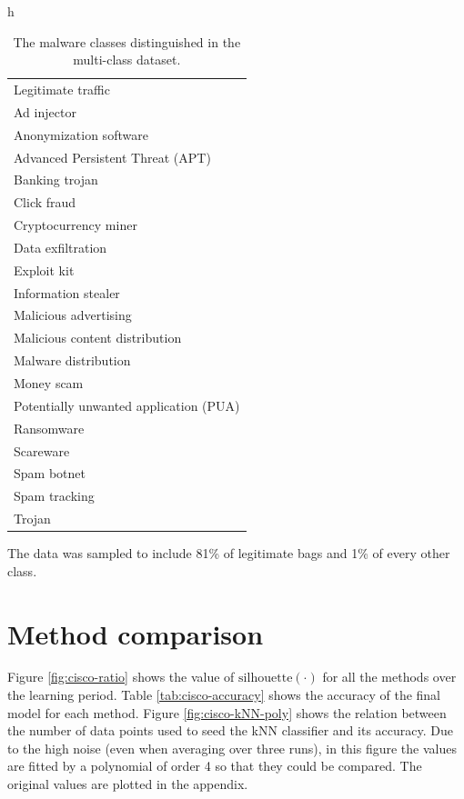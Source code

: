 \begin{table}{h}
  \centering
  \begin{tabular}{l}
    \toprule
    Legitimate traffic \\
    Ad injector \\
    Anonymization software \\
    Advanced Persistent Threat (APT) \\
    Banking trojan \\
    Click fraud \\
    Cryptocurrency miner \\
    Data exfiltration \\
    Exploit kit \\
    Information stealer \\
    Malicious advertising \\
    Malicious content distribution \\
    Malware distribution \\
    Money scam \\
    Potentially unwanted application (PUA) \\
    Ransomware \\
    Scareware \\
    Spam botnet \\
    Spam tracking \\
    Trojan \\
    \bottomrule
  \end{tabular}
  \caption{The malware classes distinguished in the multi-class dataset.}\label{tab:cisco-malware-classes}
\end{table}

The data was sampled to include 81\% of legitimate bags and 1\% of every other class.

\section{Method comparison}

Figure \ref{fig:cisco-ratio} shows the value of \( \mathrm{silhouette} \left( \cdot \right) \) for all the methods over the learning period. Table \ref{tab:cisco-accuracy} shows the accuracy of the final model for each method. Figure \ref{fig:cisco-kNN-poly} shows the relation between the number of data points used to seed the kNN classifier and its accuracy. Due to the high noise (even when averaging over three runs), in this figure the values are fitted by a polynomial of order 4 so that they could be compared. The original values are plotted in the appendix.

